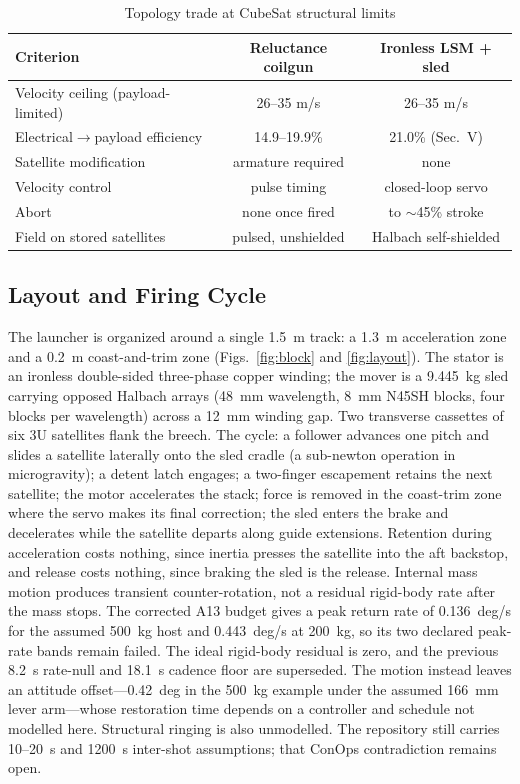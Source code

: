 \documentclass[conference]{IEEEtran}
\begin{document}
\begin{table}[t]
\caption{Topology trade at CubeSat structural limits}
\label{tab:trade}
\centering\footnotesize
\begin{tabular}{lcc}
\toprule
Criterion & Reluctance coilgun & Ironless LSM + sled\\
\midrule
Velocity ceiling (payload-limited) & 26--35 m/s & 26--35 m/s\\
Electrical$\rightarrow$payload efficiency & 14.9--19.9\% \cite{feng2025} & 21.0\% (Sec.~V)\\
Satellite modification & armature required & none\\
Velocity control & pulse timing & closed-loop servo\\
Abort & none once fired & to $\sim$45\% stroke\\
Field on stored satellites & pulsed, unshielded & Halbach self-shielded\\
\bottomrule
\end{tabular}
\end{table}

\subsection{Layout and Firing Cycle}
The launcher is organized around a single 1.5~m track: a 1.3~m acceleration zone and a 0.2~m coast-and-trim zone (Figs.~\ref{fig:block} and \ref{fig:layout}). The stator is an ironless double-sided three-phase copper winding; the mover is a 9.445~kg sled carrying opposed Halbach arrays (48~mm wavelength, 8~mm N45SH blocks, four blocks per wavelength) across a 12~mm winding gap. Two transverse cassettes of six 3U satellites flank the breech. The cycle: a follower advances one pitch and slides a satellite laterally onto the sled cradle (a sub-newton operation in microgravity); a detent latch engages; a two-finger escapement retains the next satellite; the motor accelerates the stack; force is removed in the coast-trim zone where the servo makes its final correction; the sled enters the brake and decelerates while the satellite departs along guide extensions. Retention during acceleration costs nothing, since inertia presses the satellite into the aft backstop, and release costs nothing, since braking the sled is the release. Internal mass motion produces transient counter-rotation, not a residual rigid-body rate after the mass stops. The corrected A13 budget gives a peak return rate of 0.136~deg/s for the assumed 500~kg host and 0.443~deg/s at 200~kg, so its two declared peak-rate bands remain failed. The ideal rigid-body residual is zero, and the previous 8.2~s rate-null and 18.1~s cadence floor are superseded. The motion instead leaves an attitude offset---0.42~deg in the 500~kg example under the assumed 166~mm lever arm---whose restoration time depends on a controller and schedule not modelled here. Structural ringing is also unmodelled. The repository still carries 10--20~s and 1200~s inter-shot assumptions; that ConOps contradiction remains open.
\end{document}

